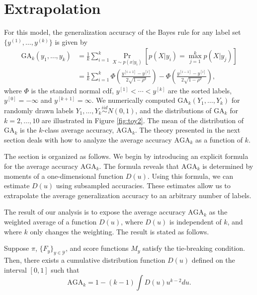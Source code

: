 \documentclass[twoside,11pt]{article}
\begin{document}
\section{Extrapolation}
\label{sec:extrapolation}


For this model, the generalization accuracy of the Bayes rule for any
label set $\{y^{(1)},\hdots, y^{(k)}\}$ is given by
\begin{align*}
\text{GA}_k(y_1,\hdots, y_k) &= \frac{1}{k}\sum_{i=1}^k \Pr_{X \sim p(x|y_i)}[p(X|y_i) = \max_{j=1}^k p(X|y_j)]
\\&= \frac{1}{k}\sum_{i=1}^k \Phi\left(\frac{y^{[i+1]} - y^{[i]}}{2\sqrt{1-\rho^2}}\right) - \Phi\left(\frac{y^{[i-1]} - y^{[i]}}{2\sqrt{1-\rho^2}}\right),
\end{align*}
where $\Phi$ is the standard normal cdf, $y^{[1]} < \cdots < y^{[k]}$
are the sorted labels, $y^{[0]} = -\infty$ and $y^{[k+1]} =
\infty$.  We numerically computed $\text{GA}_k(Y_1,\hdots, Y_k)$ for
randomly drawn labels $Y_1,\hdots, Y_k \stackrel{iid}{\sim} N(0, 1)$, and 
the distributions of $\text{GA}_k$ for $k = 2,\hdots, 10$ are
illustrated in Figure \ref{fig:toy2}.  The mean of the distribution of
$\text{GA}_k$ is the $k$-class average accuracy, $\text{AGA}_k$. The
theory presented in the next section deals with how to analyze the
average accuracy $\text{AGA}_k$ as a function of $k$.




The section is organized as follows.  We begin by introducing an
explicit formula for the average accuracy $\text{AGA}_{k}$.  The
formula reveals that $\text{AGA}_{k}$ is determined by moments of a
one-dimensional function ${D}(u)$.  Using this formula, we can estimate 
${D}(u)$ using subsampled accuracies.  These estimates allow us to extrapolate the average
generalization accuracy to an arbitrary number of labels.

The result of our analysis is to expose the average accuracy
$\text{AGA}_{k}$ as the weighted average of a function ${D}(u)$,
where ${D}(u)$ is independent of $k$, and where $k$ only changes
the weighting.  The result is stated as follows.

\begin{theorem}\label{theorem:avrisk_identity}
Suppose $\pi$, $\{F_y\}_{y \in \mathcal{Y}}$, and score functions $M_y$
satisfy the tie-breaking condition.  Then, there exists a cumulative
distribution function ${D}(u)$ defined on the interval $[0,1]$
such that
\begin{equation}\label{eq:avrisk_identity}
\text{AGA}_{k} = 1 - (k-1) \int {D}(u) u^{k-2} du.
\end{equation}
\end{theorem}
\end{document}
